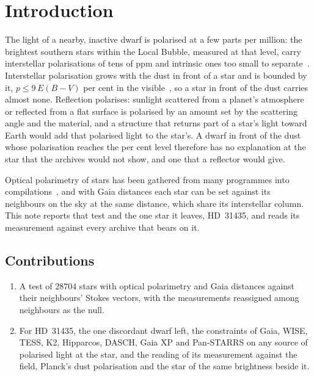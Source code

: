 \documentclass[3p,11pt]{elsarticle}
\begin{document}
\section{Introduction}\label{sec:intro}

The light of a nearby, inactive dwarf is polarised at a few parts per million: the
brightest southern stars within the Local Bubble, measured at that level, carry
interstellar polarisations of tens of ppm and intrinsic ones too small to
separate~\cite{Cotton2016}. Interstellar polarisation grows with the dust in front of a
star and is bounded by it, $p\le9\,E(B-V)$ per cent in the visible~\cite{Serkowski1975},
so a star in front of the dust carries almost none. Reflection polarises: sunlight
scattered from a planet's atmosphere or reflected from a flat surface is polarised by
an amount set by the scattering angle and the material, and a structure that returns
part of a star's light toward Earth would add that polarised light to the star's. A
dwarf in front of the dust whose polarisation reaches the per cent level therefore has
no explanation at the star that the archives would not show, and one that a reflector
would give.

Optical polarimetry of stars has been gathered from many programmes into
compilations~\cite{Heiles2000,Panopoulou2025}, and with Gaia distances each star can be
set against its neighbours on the sky at the same distance, which share its
interstellar column. This note reports that test and the one star it leaves, HD~31435,
and reads its measurement against every archive that bears on it.

\subsection{Contributions}
\begin{enumerate}[leftmargin=*,itemsep=1pt]
\item A test of $28704$ stars with optical polarimetry and Gaia distances against their
neighbours' Stokes vectors, with the measurements reassigned among neighbours as the
null.
\item For HD~31435, the one discordant dwarf left, the constraints of Gaia, WISE, TESS,
K2, Hipparcos, DASCH, Gaia XP and Pan-STARRS on any source of polarised light at the
star, and the reading of its measurement against the field, Planck's dust polarisation
and the star of the same brightness beside it.
\end{enumerate}
\end{document}
